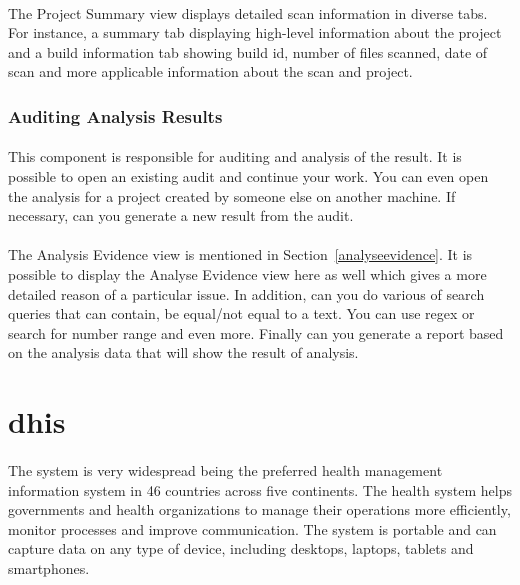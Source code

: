 \documentclass[11pt,english,a4paper]{report}
\begin{document}
\paragraph{}
The Project Summary view displays detailed scan information in diverse tabs.
For instance, a summary tab displaying high-level information about the project and a build information tab showing build id, number of files scanned, date of scan and more applicable information about the scan and project.

\subsubsection{Auditing Analysis Results}
\paragraph{}
This component is responsible for auditing and analysis of the result.
It is possible to open an existing audit and continue your work.
You can even open the analysis for a project created by someone else on another machine.
If necessary, can you generate a new result from the audit.

\paragraph{}
The Analysis Evidence view is mentioned in Section~\ref{analyseevidence}. 
It is possible to display the Analyse Evidence view here as well which gives a more detailed reason of a particular issue.
In addition, can you do various of search queries that can contain, be equal/not equal to a text.
You can use \gls{regex} or search for number range and even more. 
Finally can you generate a report based on the analysis data that will show the result of analysis.


\section{\gls{dhis}}
\paragraph{}
The system is very widespread being the preferred health management information system in 46 countries across five continents. 
The health system helps governments and health organizations to manage their operations more efficiently, monitor processes and improve communication. 
The system is portable and can capture data on any type of device, including desktops, laptops, tablets and smartphones. 
\end{document}
